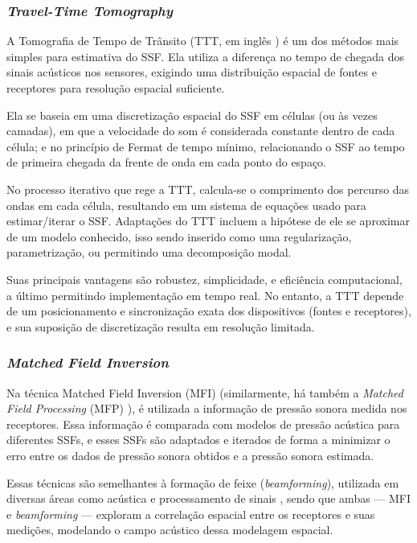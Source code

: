 \subsubsection*{\textsl{Travel-Time Tomography}}

A \gls{Tomografia de Tempo de Trânsito} (TTT, em inglês ) \cite{bormann_seismic_2012,stefanov_travel_2019} é um dos métodos mais simples para estimativa do SSF. Ela utiliza a diferença no tempo de chegada dos sinais acústicos nos sensores, exigindo uma distribuição espacial de fontes e receptores para resolução espacial suficiente.

Ela se baseia em uma discretização espacial do SSF em células (ou às vezes camadas), em que a velocidade do som é considerada constante dentro de cada célula; e no princípio de Fermat de tempo mínimo, relacionando o SSF ao tempo de primeira chegada da frente de onda em cada ponto do espaço.

No processo iterativo que rege a TTT, calcula-se o comprimento dos percurso das ondas em cada célula, resultando em um sistema de equações usado para estimar/iterar o SSF. Adaptações do TTT incluem a hipótese de ele se aproximar de um modelo conhecido, isso sendo inserido como uma regularização, parametrização, ou permitindo uma decomposição modal.

Suas principais vantagens são robustez, simplicidade, e eficiência computacional, a último permitindo implementação em tempo real. No entanto, a TTT depende de um posicionamento e sincronização exata dos dispositivos (fontes e receptores), e sua suposição de discretização resulta em resolução limitada.

\subsubsection*{\textsl{Matched Field Inversion}}

Na técnica \gls{Matched Field Inversion} (MFI) \cite{dosso_bayesian_2011} (similarmente, há também a \textsl{Matched Field Processing} (MFP) \cite{gemba_adaptive_2017}), é utilizada a informação de pressão sonora medida nos receptores. Essa informação é comparada com modelos de pressão acústica para diferentes SSFs, e esses SSFs são adaptados e iterados de forma a minimizar o erro entre os dados de pressão sonora obtidos e a pressão sonora estimada.

Essas técnicas são semelhantes à formação de feixe (\textsl{beamforming}), utilizada em diversas áreas como acústica e processamento de sinais \cite{schmidt_environmentally_1990,brienzo_broadband_1993}, sendo que ambas --- MFI e \textsl{beamforming} --- exploram a correlação espacial entre os receptores e suas medições, modelando o campo acústico dessa modelagem espacial.

